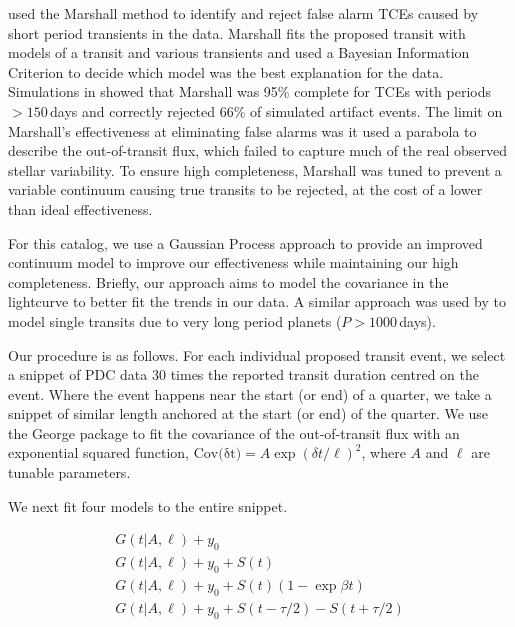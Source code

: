 \citet{Coughlin2016} used the Marshall method \citep{Mullally16} to identify and reject false alarm TCEs caused by short period transients in the data. Marshall fits the proposed transit with models of a transit and various transients and used a Bayesian Information Criterion to decide which model was the best explanation for the data. Simulations in \citet{Mullally16} showed that Marshall was 95\% complete for TCEs with periods $>150$\,days and correctly rejected 66\% of simulated artifact events. The limit on Marshall's effectiveness at eliminating false alarms was it used a parabola to describe the out-of-transit flux, which failed to capture much of the real observed stellar variability. To ensure high completeness, Marshall was tuned to prevent a variable continuum causing true transits to be rejected, at the cost of a lower than ideal effectiveness.

For this catalog, we use a Gaussian Process approach \citep[GP][]{Rasmussen10} to provide an improved continuum model to improve our effectiveness while maintaining our high completeness. Briefly, our approach aims to model the covariance in the lightcurve to better fit the trends in our data.
A similar approach was used by \citet{ForemanMackey16} to model single transits due to very long period planets ($P > 1000$\,days).

Our procedure is as follows. For each individual proposed transit event, we select a snippet of PDC data 30 times the reported transit duration centred on the event. Where the event happens near the start (or end) of a quarter, we take a snippet of similar length anchored at the start (or end) of the quarter. We use the George package \citep{Ambikasaran14} to fit the covariance of the out-of-transit flux with an exponential squared function, $ {\mathrm{Cov(\delta t})} = A \exp{ (\delta t/\ell)^2}$, where $A$ and $\ell$ are tunable parameters. 

We next fit four models to the entire snippet.

\begin{equation}
\left.\begin{aligned}
G(t | A, \ell) + y_0 \\
G(t | A, \ell) + y_0 + S(t)\\
G(t | A, \ell) + y_0 + S(t)(1 - \exp{\beta t})\\
G(t | A, \ell) + y_0 + S(t - \tau/2) - S(t + \tau/2) 
\end{aligned}\right.
\end{equation}

